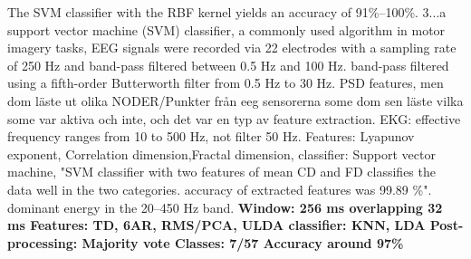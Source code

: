 {	The SVM
	classifier with the RBF kernel yields an accuracy of 91\%–100\%.
	3...a support
	vector machine (SVM) classifier, a commonly used algorithm in motor
	imagery tasks, EEG signals were recorded via
	22 electrodes with a sampling rate of 250 Hz and band-pass filtered
	between 0.5 Hz and 100 Hz.
	band-pass filtered
	using a fifth-order Butterworth filter from 0.5 Hz to 30 Hz.
	PSD features, men dom läste ut olika NODER/Punkter från eeg sensorerna some dom sen läste vilka some var aktiva och inte, och det var en typ av feature extraction.
	EKG:
	effective frequency ranges from
	10 to 500 Hz, not filter 50 Hz.
	Features: Lyapunov exponent, Correlation dimension,Fractal dimension,
	classifier: Support vector machine,
	"SVM classifier with two features of mean CD and
	FD classifies the data well in the two categories. accuracy of extracted features was 99.89 \%".
	dominant energy in the 20–450 Hz band.
	\textbf{Window: 256 ms overlapping 32 ms	Features: TD, 6AR, RMS/PCA, ULDA	classifier: KNN, LDA 	Post-processing: Majority vote	Classes: 7/57	Accuracy around 97\%
	}
}
